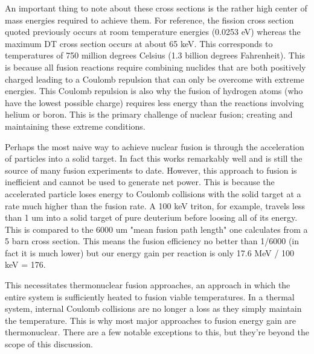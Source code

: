 An important thing to note about these cross sections is the rather high center of mass energies required to achieve them. For reference, the fission cross section quoted previously occurs at room temperature energies (0.0253 eV) whereas the maximum DT cross section occurs at about 65 keV. This corresponds to temperatures of 750 million degrees Celsius (1.3 billion degrees Fahrenheit). This is because all fusion reactions require combining nuclides that are both positively charged leading to a Coulomb repulsion that can only be overcome with extreme energies. This Coulomb repulsion is also why the fusion of hydrogen atoms (who have the lowest possible charge) requires less energy than the reactions involving helium or boron. This is the primary challenge of nuclear fusion; creating and maintaining these extreme conditions. 

Perhaps the most naive way to achieve nuclear fusion is through the acceleration of particles into a solid target. In fact this works remarkably well and is still the source of many fusion experiments to date. However, this approach to fusion is inefficient and cannot be used to generate net power. This is because the accelerated particle loses energy to Coulomb collisions with the solid target at a rate much higher than the fusion rate. A 100 keV triton, for example, travels less than 1 um into a solid target of pure deuterium before loosing all of its energy. This is compared to the 6000 um "mean fusion path length" one calculates from a 5 barn cross section. This means the fusion efficiency no better than 1/6000 (in fact it is much lower) but our energy gain per reaction is only 17.6 MeV / 100 keV = 176. 

This necessitates thermonuclear fusion approaches, an approach in which the entire system is sufficiently heated to fusion viable temperatures. In a thermal system, internal Coulomb collisions are no longer a loss as they simply maintain the temperature. This is why most major approaches to fusion energy gain are thermonuclear. There are a few notable exceptions to this, but they're beyond the scope of this discussion. 

